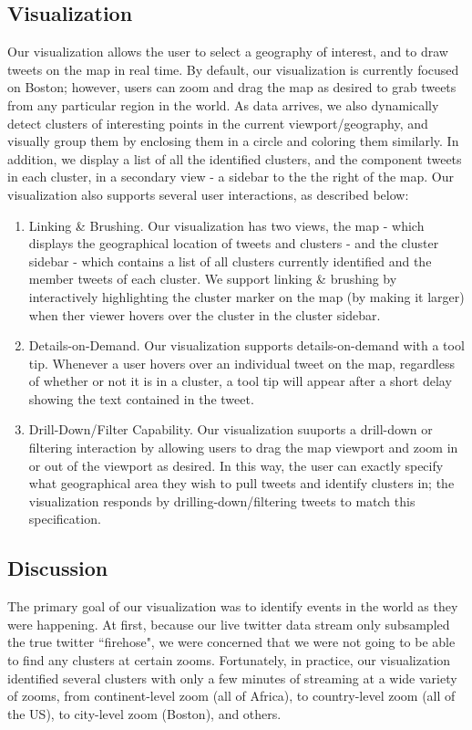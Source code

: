 \documentclass[pdftex,12pt,a4paper]{article}
\begin{document}
\subsection{Visualization}
Our visualization allows the user to select a geography of interest, and to draw tweets on the map in real time. By default, our visualization is currently focused on Boston; however, users can zoom and drag the map as desired to grab tweets from any particular region in the world. As data arrives, we also dynamically detect clusters of interesting points in the current viewport/geography, and visually group them by enclosing them in a circle and coloring them similarly. In addition, we display a list of all the identified clusters, and the component tweets in each cluster, in a secondary view - a sidebar to the the right of the map. Our visualization also supports several user interactions, as described below:
\begin{enumerate}
\item Linking \& Brushing. Our visualization has two views, the map - which displays the geographical location of tweets and clusters - and the cluster sidebar - which contains a list of all clusters currently identified and the member tweets of each cluster. We support linking \& brushing by interactively highlighting the cluster marker on the map (by making it larger) when ther viewer hovers over the cluster in the cluster sidebar. 
\item Details-on-Demand. Our visualization supports details-on-demand with a tool tip. Whenever a user hovers over an individual tweet on the map, regardless of whether or not it is in a cluster, a tool tip will appear after a short delay showing the text contained in the tweet. 
\item Drill-Down/Filter Capability. Our visualization suuports a drill-down or filtering interaction by allowing users to drag the map viewport and zoom in or out of the viewport as desired. In this way, the user can exactly specify what geographical area they wish to pull tweets and identify clusters in; the visualization responds by drilling-down/filtering tweets to match this specification. 
\end{enumerate}

\subsection{Discussion}
The primary goal of our visualization was to identify events in the world as they were happening. At first, because our live twitter data stream only subsampled the true twitter ``firehose", we were concerned that we were not going to be able to find any clusters at certain zooms. Fortunately, in practice, our visualization identified several clusters with only a few minutes of streaming at a wide variety of zooms, from continent-level zoom (all of Africa), to country-level zoom (all of the US), to city-level zoom (Boston), and others. 
\end{document}
